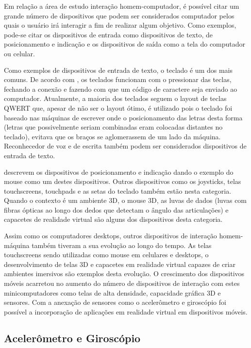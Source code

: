 Em relação a área de estudo interação homem-computador, é possível citar um grande número de dispositivos que podem ser considerados computador pelos quais o usuário irá interagir a fim de realizar algum objetivo. Como exemplos, pode-se citar os dispositivos de entrada como dispositivos de texto, de posicionamento e indicação e os dispositivos de saída como a tela do computador ou celular. 

Como exemplos de dispositivos de entrada de texto, o teclado é um dos mais comuns. De acordo com , os teclados funcionam com o pressionar das teclas, fechando a conexão e fazendo com que um código de caractere seja enviado ao computador. Atualmente, a maioria dos teclados seguem o layout de teclas QWERT que, apesar de não ser o layout ótimo, é utilizado pois o teclado foi baseado nas máquinas de escrever onde o posicionamento das letras desta forma (letras que possivelmente seriam combinadas eram colocadas distantes no teclado), evitava que os braços se aglomerassem de um lado da máquina. Reconhecedor de voz e de escrita também podem ser considerados dispositivos de entrada de texto.

 descrevem os dispositivos de posicionamento e indicação dando o exemplo do mouse como um destes dispositivos. Outros dispositivos como os joysticks, telas touchscreens, touchpads e as setas do teclado também estão nesta categoria.  Quando o contexto é um ambiente 3D, o mouse 3D, as luvas de dados (luvas com fibras ópticas ao longo dos dedos que detectam o ângulo das articulações) e capacetes de realidade virtual são alguns dos dispositivos desta categoria. 

Assim como os computadores desktops, outros dispositivos de interação homem-máquina também tiveram a sua evolução ao longo do tempo. As telas touchscreens sendo utilizadas como mouse em celulares e desktops, o desenvolvimento de telas 3D e capacetes em realidade virtual capazes de criar ambientes imersivos são exemplos desta evolução. O crescimento dos dispositivos móveis acarretou no aumento do número de dispositivos de interação com estes minicomputadores como telas de alta densidade, capacidade gráfica 3D e sensores. Com a anexação de sensores como o acelerômetro e giroscópio foi possível a incorporação de aplicações em realidade virtual em dispositivos móveis.

\subsection{Acelerômetro e Giroscópio}
\label{ss.acelerometrogiroscopio}

